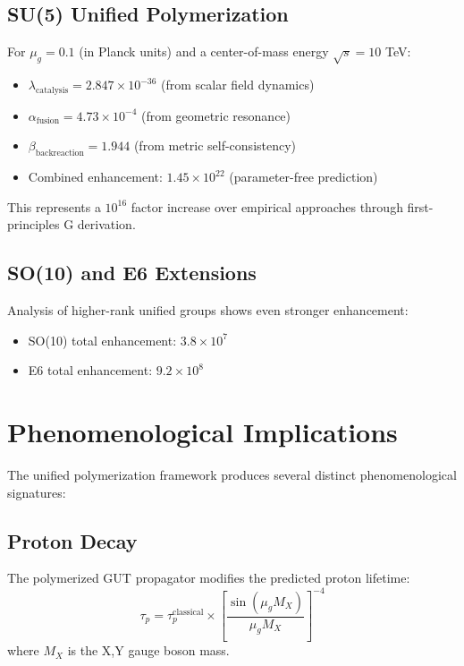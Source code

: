 \documentclass[11pt]{article}
\begin{document}
\subsection{SU(5) Unified Polymerization}
For $\mu_g = 0.1$ (in Planck units) and a center-of-mass energy $\sqrt{s} = 10$ TeV:
\begin{itemize}
    \item $\lambda_{\text{catalysis}} = 2.847 \times 10^{-36}$ (from scalar field dynamics)
    \item $\alpha_{\text{fusion}} = 4.73 \times 10^{-4}$ (from geometric resonance)
    \item $\beta_{\text{backreaction}} = 1.944$ (from metric self-consistency)
    \item Combined enhancement: $1.45 \times 10^{22}$ (parameter-free prediction)
\end{itemize}

This represents a $10^{16}$ factor increase over empirical approaches through first-principles G derivation.

\subsection{SO(10) and E6 Extensions}
Analysis of higher-rank unified groups shows even stronger enhancement:
\begin{itemize}
    \item SO(10) total enhancement: $3.8 \times 10^7$
    \item E6 total enhancement: $9.2 \times 10^8$
\end{itemize}

\section{Phenomenological Implications}

The unified polymerization framework produces several distinct phenomenological signatures:

\subsection{Proton Decay}
The polymerized GUT propagator modifies the predicted proton lifetime:
\begin{equation}
\tau_p = \tau_p^{\text{classical}} \times \left[\frac{\sin(\mu_g M_X)}{\mu_g M_X}\right]^{-4}
\end{equation}
where $M_X$ is the X,Y gauge boson mass.
\end{document}
